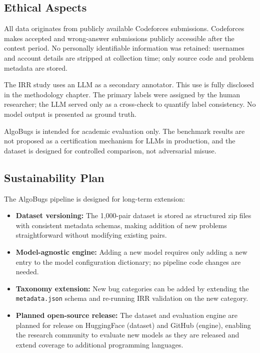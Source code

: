 \subsection{Ethical Aspects}

All data originates from publicly available Codeforces submissions. Codeforces makes accepted and wrong-answer submissions publicly accessible after the contest period. No personally identifiable information was retained: usernames and account details are stripped at collection time; only source code and problem metadata are stored.

The IRR study uses an LLM as a secondary annotator. This use is fully disclosed in the methodology chapter. The primary labels were assigned by the human researcher; the LLM served only as a cross-check to quantify label consistency. No model output is presented as ground truth.

AlgoBugs is intended for academic evaluation only. The benchmark results are not proposed as a certification mechanism for LLMs in production, and the dataset is designed for controlled comparison, not adversarial misuse.

\subsection{Sustainability Plan}

The AlgoBugs pipeline is designed for long-term extension:

\begin{itemize}
    \item \textbf{Dataset versioning:} The 1,000-pair dataset is stored as structured zip files with consistent metadata schemas, making addition of new problems straightforward without modifying existing pairs.
    \item \textbf{Model-agnostic engine:} Adding a new model requires only adding a new entry to the model configuration dictionary; no pipeline code changes are needed.
    \item \textbf{Taxonomy extension:} New bug categories can be added by extending the \texttt{metadata.json} schema and re-running IRR validation on the new category.
    \item \textbf{Planned open-source release:} The dataset and evaluation engine are planned for release on HuggingFace (dataset) and GitHub (engine), enabling the research community to evaluate new models as they are released and extend coverage to additional programming languages.
\end{itemize}

